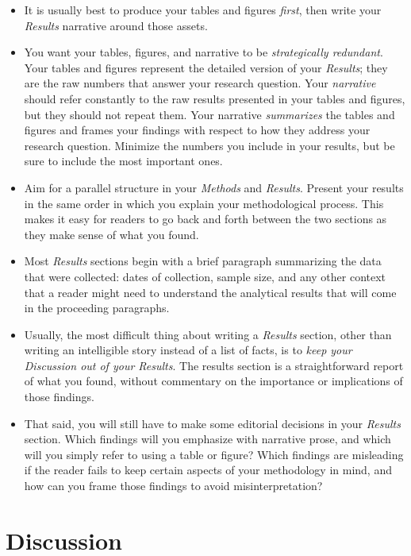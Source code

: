 \documentclass[]{book}
\begin{document}
\begin{itemize}
\item
  It is usually best to produce your tables and figures \emph{first}, then write your \emph{Results} narrative around those assets.
\item
  You want your tables, figures, and narrative to be \emph{strategically redundant}. Your tables and figures represent the detailed version of your \emph{Results}; they are the raw numbers that answer your research question. Your \emph{narrative} should refer constantly to the raw results presented in your tables and figures, but they should not repeat them. Your narrative \emph{summarizes} the tables and figures and frames your findings with respect to how they address your research question. Minimize the numbers you include in your results, but be sure to include the most important ones.
\item
  Aim for a parallel structure in your \emph{Methods} and \emph{Results}. Present your results in the same order in which you explain your methodological process. This makes it easy for readers to go back and forth between the two sections as they make sense of what you found.
\item
  Most \emph{Results} sections begin with a brief paragraph summarizing the data that were collected: dates of collection, sample size, and any other context that a reader might need to understand the analytical results that will come in the proceeding paragraphs.
\item
  Usually, the most difficult thing about writing a \emph{Results} section, other than writing an intelligible story instead of a list of facts, is to \emph{keep your Discussion out of your Results}. The results section is a straightforward report of what you found, without commentary on the importance or implications of those findings.
\item
  That said, you will still have to make some editorial decisions in your \emph{Results} section. Which findings will you emphasize with narrative prose, and which will you simply refer to using a table or figure? Which findings are misleading if the reader fails to keep certain aspects of your methodology in mind, and how can you frame those findings to avoid misinterpretation?
\end{itemize}

\hypertarget{discussion}{%
\section*{Discussion}\label{discussion}}
\end{document}
